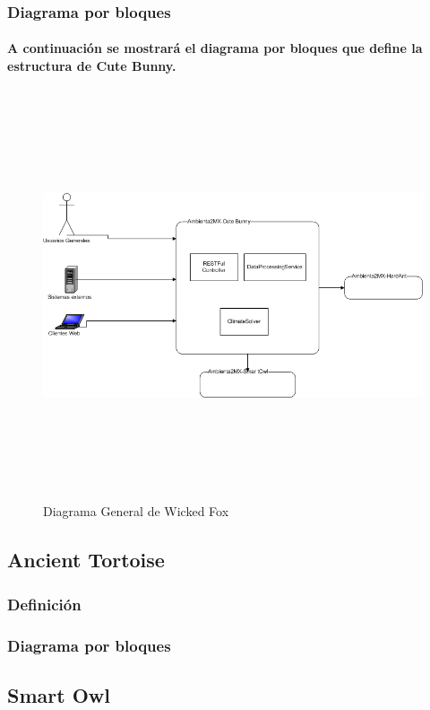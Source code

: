     \subsubsection{Diagrama por bloques}
      \paragraph{A continuación se mostrará el diagrama por bloques que define la estructura de Cute Bunny.}
      \newpage
      \begin{landscape}
        \begin{figure}[h!]
        \centering
        \includegraphics[width=22.5cm,height=12cm]{./images/DiagramaCuteBunny.png}
        \caption{Diagrama General de Wicked Fox}
      \end{figure}
      \end{landscape}
      \newpage
  \subsection{Ancient Tortoise}
    \subsubsection{Definición}
    \subsubsection{Diagrama por bloques}
  \subsection{Smart Owl}
